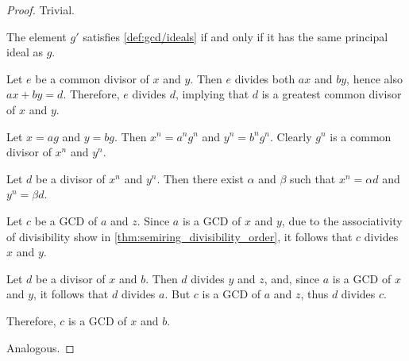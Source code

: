 \begin{proof}
   Trivial.

   The element \( g' \) satisfies \cref{def:gcd/ideals} if and only if it has the same principal ideal as \( g \).

   Let \( e \) be a common divisor of \( x \) and \( y \). Then \( e \) divides both \( ax \) and \( by \), hence also \( ax + by = d \). Therefore, \( e \) divides \( d \), implying that \( d \) is a greatest common divisor of \( x \) and \( y \).

   Let \( x = ag \) and \( y = bg \). Then \( x^n = a^n g^n \) and \( y^n = b^n g^n \). Clearly \( g^n \) is a common divisor of \( x^n \) and \( y^n \).

  Let \( d \) be a divisor of \( x^n \) and \( y^n \). Then there exist \( \alpha \) and \( \beta \) such that \( x^n = \alpha d \) and \( y^n = \beta d \).


  \SufficiencySubProof* Let \( c \) be a GCD of \( a \) and \( z \). Since \( a \) is a GCD of \( x \) and \( y \), due to the associativity of divisibility show in \cref{thm:semiring_divisibility_order}, it follows that \( c \) divides \( x \) and \( y \).

  Let \( d \) be a divisor of \( x \) and \( b \). Then \( d \) divides \( y \) and \( z \), and, since \( a \) is a GCD of \( x \) and \( y \), it follows that \( d \) divides \( a \). But \( c \) is a GCD of \( a \) and \( z \), thus \( d \) divides \( c \).

  Therefore, \( c \) is a GCD of \( x \) and \( b \).

  \NecessitySubProof* Analogous.
\end{proof}

